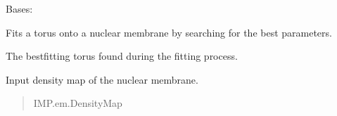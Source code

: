 \documentclass[letterpaper,10pt,english]{sphinxmanual}
\begin{document}
\begin{fulllineitems}
\label{\detokenize{src:src.BagelFitter.BagelFitter}}
\pysigstartsignatures
{}
\pysigstopsignatures
\sphinxAtStartPar
Bases: 

\sphinxAtStartPar
Fits a torus onto a nuclear membrane by searching for the best parameters.

\begin{fulllineitems}
\label{\detokenize{src:src.BagelFitter.BagelFitter.best_torus}}
\pysigstartsignatures
{}
\pysigstopsignatures
\sphinxAtStartPar
The best\sphinxhyphen{}fitting torus found during the fitting process.
\begin{quote}\begin{description}
\sphinxAtStartPar
{\hyperref[\detokenize{src:src.Torus.Torus}]{}}

\end{description}\end{quote}

\end{fulllineitems}


\begin{fulllineitems}
\label{\detokenize{src:src.BagelFitter.BagelFitter.dmap}}
\pysigstartsignatures
{}
\pysigstopsignatures
\sphinxAtStartPar
Input density map of the nuclear membrane.
\begin{quote}\begin{description}
\sphinxAtStartPar
IMP.em.DensityMap

\end{description}\end{quote}

\end{fulllineitems}



\end{fulllineitems}
\end{document}

